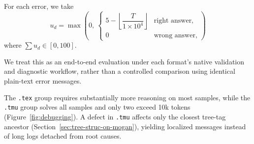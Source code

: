 
For each error, we take
\begingroup\small
\[
    u_d = \max\left(0,\ \begin{cases}
        5 - \left\lfloor \dfrac{T}{1 \times 10^4} \right\rfloor & \text{right answer,} \\[6pt]
        0 & \text{wrong answer,}
    \end{cases} \right)
\]
\endgroup
where $\sum u_d \in [0, 100]$.

 We treat this as an end-to-end evaluation under each format's native validation and diagnostic workflow, rather than a controlled comparison using identical plain-text error messages.

The \texttt{.tex} group requires substantially more reasoning on most samples, while the \texttt{.tmu} group solves all samples and only two exceed 10k tokens (Figure~\ref{fig:debugging}). A defect in \texttt{.tmu} affects only the closest tree-tag ancestor (Section~\ref{sec:tree-struc-on-mogan}), yielding localized messages instead of long logs detached from root causes.

